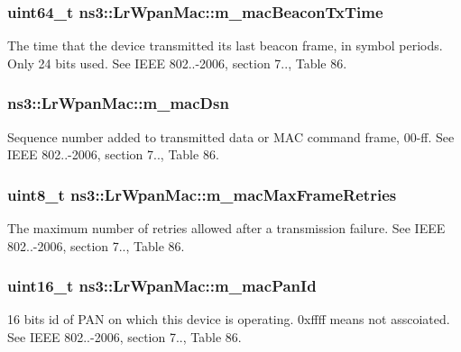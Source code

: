 \subsubsection[{\texorpdfstring{m\+\_\+mac\+Beacon\+Tx\+Time}{m_macBeaconTxTime}}]{\setlength{\rightskip}{0pt plus 5cm}uint64\+\_\+t ns3\+::\+Lr\+Wpan\+Mac\+::m\+\_\+mac\+Beacon\+Tx\+Time}\hypertarget{classns3_1_1LrWpanMac_ae8d4ba1b1080f7b17adc8cdbaca6ff5a}{}\label{classns3_1_1LrWpanMac_ae8d4ba1b1080f7b17adc8cdbaca6ff5a}
The time that the device transmitted its last beacon frame, in symbol periods. Only 24 bits used. See I\+E\+EE 802..-\/2006, section 7.., Table 86. 
\subsubsection[{\texorpdfstring{m\+\_\+mac\+Dsn}{m_macDsn}}]{ ns3\+::\+Lr\+Wpan\+Mac\+::m\+\_\+mac\+Dsn}\hypertarget{classns3_1_1LrWpanMac_a8a24e6d96342082f7b0343bdd0800d8c}{}\label{classns3_1_1LrWpanMac_a8a24e6d96342082f7b0343bdd0800d8c}
Sequence number added to transmitted data or M\+AC command frame, 00-\/ff. See I\+E\+EE 802..-\/2006, section 7.., Table 86. 
\subsubsection[{\texorpdfstring{m\+\_\+mac\+Max\+Frame\+Retries}{m_macMaxFrameRetries}}]{\setlength{\rightskip}{0pt plus 5cm}uint8\+\_\+t ns3\+::\+Lr\+Wpan\+Mac\+::m\+\_\+mac\+Max\+Frame\+Retries}\hypertarget{classns3_1_1LrWpanMac_a4c627b0db8f366077e108ede4268cf7c}{}\label{classns3_1_1LrWpanMac_a4c627b0db8f366077e108ede4268cf7c}
The maximum number of retries allowed after a transmission failure. See I\+E\+EE 802..-\/2006, section 7.., Table 86. 
\subsubsection[{\texorpdfstring{m\+\_\+mac\+Pan\+Id}{m_macPanId}}]{\setlength{\rightskip}{0pt plus 5cm}uint16\+\_\+t ns3\+::\+Lr\+Wpan\+Mac\+::m\+\_\+mac\+Pan\+Id}\hypertarget{classns3_1_1LrWpanMac_abb75c742ae20c41dd10a721605328a82}{}\label{classns3_1_1LrWpanMac_abb75c742ae20c41dd10a721605328a82}
16 bits id of P\+AN on which this device is operating. 0xffff means not asscoiated. See I\+E\+EE 802..-\/2006, section 7.., Table 86. 
